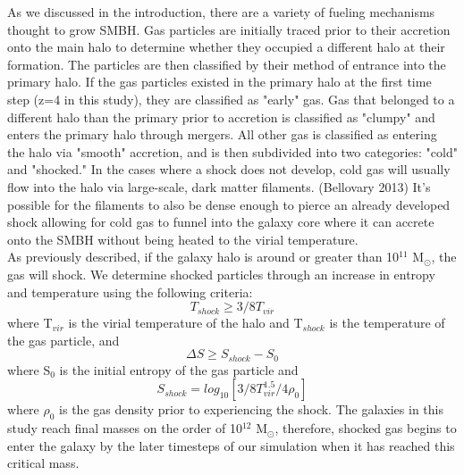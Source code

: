 \documentclass[manuscript]{aastex}
\begin{document}
	As we discussed in the introduction, there are a variety of fueling mechanisms thought to grow SMBH. Gas particles are initially traced prior to their accretion onto the main halo to determine whether they occupied a different halo at their formation. The particles are then classified by their method of entrance into the primary halo. If the gas particles existed in the primary halo at the first time step (z=4 in this study), they are classified as "early" gas. Gas that belonged to a different halo than the primary prior to accretion is classified as "clumpy" and enters the primary halo through mergers. All other gas is classified as entering the halo via "smooth" accretion, and is then subdivided into two categories: "cold" and "shocked." In the cases where a shock does not develop, cold gas will usually flow into the halo via large-scale, dark matter filaments. (Bellovary 2013) It's possible for the filaments to also be dense enough to pierce an already developed shock allowing for cold gas to funnel into the galaxy core where it can accrete onto the SMBH without being heated to the virial temperature.\\

	As previously described, if the galaxy halo is around or greater than 10$^{11}$ M$_{\odot} $, the gas will shock. We determine shocked particles through an increase in entropy and temperature using the following criteria:
\begin{equation}
T_{shock} \geq 3/8 T_{vir}
\end{equation}
where T$_{vir}$ is the virial temperature of the halo and T$_{shock}$ is the temperature of the gas particle, and 
\begin{equation}
\Delta S \geq S_{shock} - S_0
\end{equation}
where S$_0$ is the initial entropy of the gas particle and 
\begin{equation}
S_{shock} = log_{10}[3/8 T_{vir}^{1.5}/4 \rho_0]
\end{equation}
where $\rho_0$ is the gas density prior to experiencing the shock. The galaxies in this study reach final masses on the order of 10$^{12}$ M$_{\odot} $, therefore, shocked gas begins to enter the galaxy by the later timesteps of our simulation when it has reached this critical mass. \\

\end{document}
